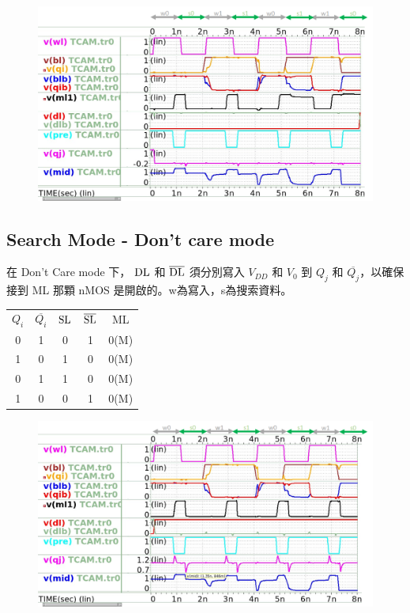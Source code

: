 \documentclass{article}
\begin{document}
\begin{figure}[H]
\centering
\includegraphics[width=\linewidth]{./img/2023-12-14-00-13-55.png}
\end{figure}

\subsection{Search Mode - Don't care mode}

在 Don't Care mode 下， $\rm DL$ 和 $\rm \overline{DL}$ 須分別寫入 $V_{DD}$ 和 $V_{0}$ 到 $Q_j$ 和 $\overline{Q_j}$，以確保接到 ML 那顆 nMOS 是開啟的。w為寫入，s為搜索資料。

\begin{table}[H]
  \centering
  \begin{tabular}{ccccc}
  $Q_i$ & $\overline{Q_i}$ & $\rm SL$ & $\rm \overline{SL}$ & ML \\
  0  & 1     & 0  & 1     & 0(M) \\
  1  & 0     & 1  & 0     & 0(M) \\
  0  & 1     & 1  & 0     & 0(M) \\
  1  & 0     & 0  & 1     & 0(M)
  \end{tabular}
  \end{table}

\begin{figure}[H]
\centering
\includegraphics[width=\linewidth]{./img/2023-12-14-00-14-04.png}
\end{figure}
\end{document}
